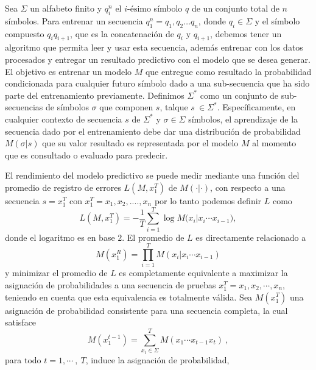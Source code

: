 % 
%
%


Sea $\Sigma$ un alfabeto finito y $q_{i}^{n}$ el $i\mbox{-ésimo}$ símbolo $q$ de un conjunto total de $n$ símbolos. Para entrenar un secuencia $q_{1}^{n}=q_{1},q_{2} \dots q_{n}$, donde $q_{i} \in \Sigma$ y el símbolo compuesto $q_{i}q_{i+1}$, que es la concatenación de $q_{i}$ y $q_{i+1}$, debemos tener un algoritmo que permita leer y usar esta secuencia, además entrenar con los datos procesados y entregar un resultado predictivo con el modelo que se desea generar. El objetivo es entrenar un modelo $M$ que entregue como resultado la probabilidad condicionada para cualquier futuro símbolo dado a una sub-secuencia que ha sido parte del entrenamiento previamente.
Definimos $\Sigma^{*}$ como un conjunto de sub-secuencias de símbolos $\sigma$ que componen $s$, talque $s \ \in \Sigma^{*} $. Específicamente, en cualquier contexto de secuencia $s$ de $\Sigma^{*}$  y  $\sigma \in \Sigma$ símbolos, el aprendizaje de la secuencia dado por el entrenamiento debe dar una distribución de probabilidad $M(\sigma | s )$ que su valor resultado es representada por el modelo $M$ al momento que es consultado o evaluado para predecir.

El rendimiento del modelo predictivo se puede medir mediante una función del promedio de registro de errores $L(M,x_{1}^{T})$ de $M (\cdot | \cdot )$, con respecto a una secuencia $s = x_{1}^{T}$ con $x_{1}^{T}= x_{1},x_{2},....,x_{n} $ %
  por lo tanto podemos definir $L$ como \begin{equation} L( M , x_{1}^{T} ) = 
- \dfrac{1}{T} 
\sum _{i=1}^{T} \log{ M(x_{i} | x_{i} \cdots x_{i-1}} ),\end{equation}
donde el logaritmo es en base $2$.  El promedio de $L$ es directamente relacionado a  \begin{equation}M(x_{1}^{R}) = \prod_{i=1}^{T} M(x_{i} | x_{i} \cdots x_{i-1} ) \end{equation} y minimizar el promedio de $L$ es completamente equivalente a maximizar la asignación de probabilidades a una secuencia de pruebas $x_{1}^{T}= x_{1},x_{2},\cdots,x_{n} $, teniendo en cuenta que esta equivalencia es totalmente válida. 
Sea $M(x_{1}^{T})$ una asignación de probabilidad consistente para una secuencia completa, la cual satisface \begin{equation}
M(x_{1}^{t-1}) = \sum_{\mbox{$x_t$} \in \Sigma}^{T} M(x_{1} \cdots x_{t-1}x_{t} ) \ , 
\end{equation}para todo $t=1,\cdots\ ,\ T$, induce la asignación de probabilidad,

